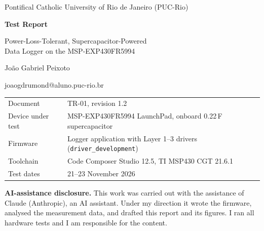 \documentclass[11pt,a4paper]{article}
\newcommand{\code}[1]{\texttt{#1}}
\newcommand{\docid}{TR-01}
\newcommand{\docrev}{1.2}
\begin{document}
\begin{titlepage}
\centering
\vspace*{1.5cm}
{\large Pontifical Catholic University of Rio de Janeiro (PUC-Rio)\par}
\vspace{2.2cm}
{\LARGE\bfseries Test Report\par}
\vspace{0.4cm}
{\Large Power-Loss-Tolerant, Supercapacitor-Powered\\ Data Logger on the MSP-EXP430FR5994\par}
\vspace{1.6cm}
{\large Jo\~{a}o Gabriel Peixoto\par}
{\normalsize joaogdrumond@aluno.puc-rio.br\par}
\vspace{1.6cm}
\begin{tabular}{@{}ll@{}}
\toprule
Document & \docid{}, revision \docrev \\
Device under test & MSP-EXP430FR5994 LaunchPad, onboard 0.22\,F supercapacitor \\
Firmware & Logger application with Layer 1--3 drivers (\code{driver\_development}) \\
Toolchain & Code Composer Studio 12.5, TI MSP430 CGT 21.6.1 \\
Test dates & 21--23 November 2026 \\
\bottomrule
\end{tabular}
\vfill
\begin{minipage}{0.86\textwidth}\small
\textbf{AI-assistance disclosure.} This work was carried out with the assistance of Claude (Anthropic), an AI assistant. Under my direction it wrote the firmware, analysed the measurement data, and drafted this report and its figures. I ran all hardware tests and I am responsible for the content.
\end{minipage}
\vspace{1cm}
\end{titlepage}
\end{document}
